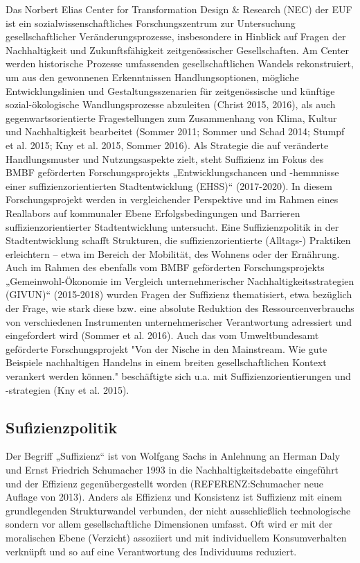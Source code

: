 \documentclass[a4paper,11pt,twoside]{scrartcl}
\begin{document}
Das Norbert Elias Center for Transformation Design & Research (NEC) der EUF ist ein sozialwissenschaftliches Forschungszentrum zur Untersuchung gesellschaftlicher Veränderungsprozesse, insbesondere in Hinblick auf Fragen der Nachhaltigkeit und Zukunftsfähigkeit zeitgenössischer Gesellschaften. Am Center werden historische Prozesse umfassenden gesellschaftlichen Wandels rekonstruiert, um aus den gewonnenen Erkenntnissen Handlungsoptionen, mögliche Entwicklungslinien und Gestaltungsszenarien für zeitgenössische und künftige sozial-ökologische Wandlungsprozesse abzuleiten (Christ 2015, 2016), als auch gegenwartsorientierte Fragestellungen zum Zusammenhang von Klima, Kultur und Nachhaltigkeit bearbeitet (Sommer 2011; Sommer und Schad 2014; Stumpf et al. 2015; Kny et al. 2015, Sommer 2016).
Als Strategie die auf veränderte Handlungsmuster und Nutzungsaspekte zielt, steht Suffizienz im Fokus des BMBF geförderten Forschungsprojekts „Entwicklungschancen und -hemmnisse einer suffizienzorientierten Stadtentwicklung (EHSS)“ (2017-2020). In diesem Forschungsprojekt werden in vergleichender Perspektive und im Rahmen eines Reallabors auf kommunaler Ebene Erfolgsbedingungen und Barrieren suffizienzorientierter Stadtentwicklung untersucht. Eine Suffizienzpolitik in der Stadtentwicklung schafft Strukturen, die suffizienzorientierte (Alltags-) Praktiken erleichtern – etwa im Bereich der Mobilität, des Wohnens oder der Ernährung.
Auch im Rahmen des ebenfalls vom BMBF geförderten Forschungsprojekts „Gemeinwohl-Ökonomie im Vergleich unternehmerischer Nachhaltigkeitsstrategien (GIVUN)“ (2015-2018) wurden Fragen der Suffizienz thematisiert, etwa bezüglich der Frage, wie stark diese bzw. eine absolute Reduktion des Ressourcenverbrauchs von verschiedenen Instrumenten unternehmerischer Verantwortung adressiert und eingefordert wird (Sommer et al. 2016). Auch das vom Umweltbundesamt geförderte Forschungsprojekt "Von der Nische in den Mainstream. Wie gute Beispiele nachhaltigen Handelns in einem breiten gesellschaftlichen Kontext verankert werden können." beschäftigte sich u.a. mit Suffizienzorientierungen und -strategien (Kny et al. 2015).
    
\subsection*{Sufizienzpolitik}
Der Begriff „Suffizienz“ ist von Wolfgang Sachs in Anlehnung an Herman Daly und Ernst Friedrich Schumacher 1993 in die Nachhaltigkeitsdebatte eingeführt und der Effizienz gegenübergestellt worden \cite{Sachs1993,Daly1991} (REFERENZ:Schumacher neue Auflage von 2013). Anders als Effizienz und Konsistenz ist Suffizienz mit einem grundlegenden Strukturwandel verbunden, der nicht ausschließlich technologische sondern vor allem gesellschaftliche Dimensionen umfasst. Oft wird er mit der moralischen Ebene (Verzicht) assoziiert und mit individuellem Konsumverhalten verknüpft und so auf eine Verantwortung des Individuums reduziert.
\end{document}
